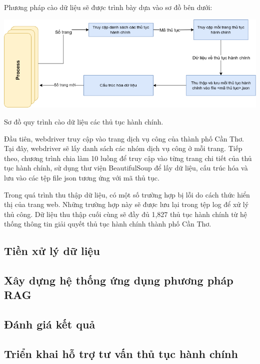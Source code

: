 \documentclass[a4paper, 12pt, openany]{book}
\begin{document}
Phương pháp cào dữ liệu sẽ được trình bày dựa vào sơ đồ bên dưới:

\begin{minipage}{\linewidth}
    \centering
    \includegraphics[width=14cm]{./assets/images/procedure-crawl.png}
    \captionsetup{type=figure}
    \caption{Sơ đồ quy trình cào dữ liệu các thủ tục hành chính.}
\end{minipage}

Đầu tiên, webdriver truy cập vào trang dịch vụ công của thành phố Cần Thơ. Tại đây, webdriver sẽ lấy danh sách các nhóm dịch vụ công ở mỗi trang.
Tiếp theo, chương trình chia làm 10 luồng để truy cập vào từng trang chi tiết của thủ tục hành chính, sử dụng thư viện BeautifulSoup để lấy dữ liệu, cấu trúc hóa và lưu vào các tệp file json tương ứng với mã thủ tục.

Trong quá trình thu thập dữ liệu, có một số trường hợp bị lỗi do cách thức hiển thị của trang web. Những trường hợp này sẽ được lưu lại trong tệp log để xử lý thủ công. Dữ liệu thu thập cuối cùng sẽ đầy đủ 1,827 thủ tục hành chính từ hệ thống thông tin giải quyết thủ tục hành chính thành phố Cần Thơ.
\subsection{Tiền xử lý dữ liệu}

\subsection{Xây dựng hệ thống ứng dụng phương pháp RAG}

\subsection{Đánh giá kết quả}

\subsection{Triển khai hỗ trợ tư vấn thủ tục hành chính}
\end{document}
